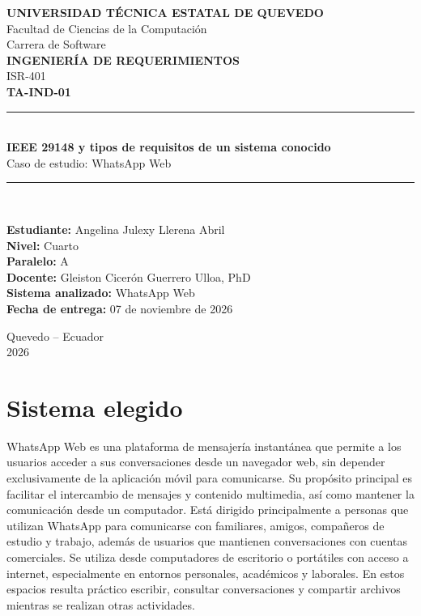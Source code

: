 \documentclass[12pt,a4paper,oneside]{article}
\newcommand{\nombreestudiante}{Angelina Julexy Llerena Abril}
\newcommand{\paralelo}{A}
\newcommand{\fechaentrega}{07 de noviembre de 2026}
\newcommand{\sistema}{WhatsApp Web}
\begin{document}
\begin{titlepage}
    \centering

    {\large \textbf{UNIVERSIDAD TÉCNICA ESTATAL DE QUEVEDO}}\\[0.3cm]
    {\large Facultad de Ciencias de la Computación}\\
    {\large Carrera de Software}\\[1.5cm]

    {\Large \textbf{INGENIERÍA DE REQUERIMIENTOS}}\\[0.5cm]
    {\large ISR-401}\\[1.5cm]

    {\LARGE \textbf{TA-IND-01}}\\[0.9cm]

    \rule{0.85\textwidth}{0.5pt}\\[0.5cm]

    {\large \textbf{IEEE 29148 y tipos de requisitos de un sistema conocido}}\\
    {\large Caso de estudio: \sistema}\\[0.5cm]

    \rule{0.85\textwidth}{0.5pt}\\[2cm]

    \begin{flushleft}
        \textbf{Estudiante:} \nombreestudiante\\[0.4cm]
        \textbf{Nivel:} Cuarto\\[0.4cm]
        \textbf{Paralelo:} \paralelo\\[0.4cm]
        \textbf{Docente:} Gleiston Cicerón Guerrero Ulloa, PhD\\[0.4cm]
        \textbf{Sistema analizado:} \sistema\\[0.4cm]
        \textbf{Fecha de entrega:} \fechaentrega
    \end{flushleft}

    \vfill

    {\large Quevedo -- Ecuador}\\
    {\large 2026}

\end{titlepage}

\section{Sistema elegido}

WhatsApp Web es una plataforma de mensajería instantánea que permite a los usuarios acceder a sus conversaciones desde un navegador web, sin depender exclusivamente de la aplicación móvil para comunicarse. Su propósito principal es facilitar el intercambio de mensajes y contenido multimedia, así como mantener la comunicación desde un computador. Está dirigido principalmente a personas que utilizan WhatsApp para comunicarse con familiares, amigos, compañeros de estudio y trabajo, además de usuarios que mantienen conversaciones con cuentas comerciales. Se utiliza desde computadores de escritorio o portátiles con acceso a internet, especialmente en entornos personales, académicos y laborales. En estos espacios resulta práctico escribir, consultar conversaciones y compartir archivos mientras se realizan otras actividades.
\end{document}
